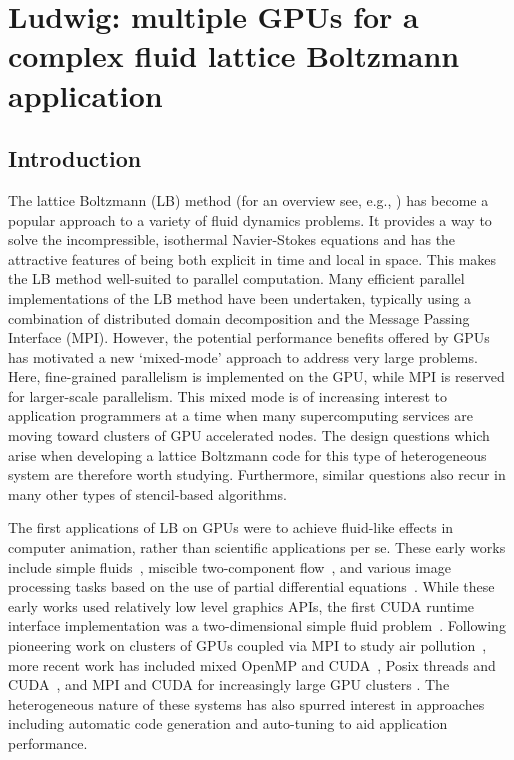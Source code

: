 
\chapter{Ludwig: multiple GPUs for a complex fluid lattice Boltzmann
application}



\section{Introduction}
The lattice Boltzmann (LB) method (for an overview see, e.g.,
\cite{succi-book}) has become a popular approach to a variety of fluid
dynamics problems.  It provides a way to solve the incompressible,
isothermal Navier-Stokes equations and has the attractive features of
being both explicit in time and local in space. This makes the LB
method well-suited to parallel computation. Many efficient parallel
implementations of the LB method have been undertaken, typically using
a combination of distributed domain decomposition and the Message
Passing Interface (MPI). However, the potential
performance benefits offered by GPUs has motivated a new `mixed-mode'
approach to address very large problems. Here, fine-grained
parallelism is implemented on the GPU, while MPI is reserved for
larger-scale parallelism.  This mixed mode is of increasing interest
to application programmers at a time when many supercomputing services
are moving
toward clusters of GPU accelerated nodes. The design questions which
arise when developing a lattice Boltzmann code for this type of
heterogeneous system are therefore worth studying. Furthermore, similar
questions also recur in many other types of stencil-based algorithms.

The first applications of LB on GPUs were to achieve fluid-like
effects in computer animation, rather than scientific applications per
se.  These early works include simple fluids~\cite{wei2004}, miscible
two-component flow~\cite{zhu2006}, and various image processing tasks
based on the use of partial differential equations~\cite{zhao2007}.
While these early works used relatively low level graphics APIs, the
first CUDA runtime interface implementation was a two-dimensional
simple fluid problem~\cite{toelke2010}.  Following pioneering work on
clusters of GPUs coupled via MPI to study air
pollution~\cite{fan2004}, more recent work has included mixed OpenMP
and CUDA~\cite{myre2011}, Posix threads and CUDA~\cite{obrecht2011},
and MPI and CUDA for increasingly large GPU clusters
\cite{bernaschi2010,xian2011,feichtinger2011}. The heterogeneous
nature of these systems has also spurred interest in approaches
including automatic code generation \cite{walshsaar2012} and auto-tuning
\cite{williams2011} to aid application performance.

